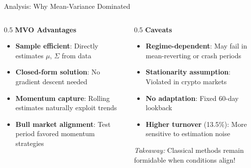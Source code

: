 \documentclass[aspectratio=169]{beamer}
\begin{document}
\begin{frame}{Analysis: Why Mean-Variance Dominated}
\small

\begin{columns}[T,totalwidth=\textwidth]
\begin{column}{0.5\textwidth}
\textbf{MVO Advantages}
\begin{itemize}\setlength{\itemsep}{4pt}
  \item \textbf{Sample efficient}: Directly estimates $\mu$, $\Sigma$ from data
  \item \textbf{Closed-form solution}: No gradient descent needed
  \item \textbf{Momentum capture}: Rolling estimates naturally exploit trends
  \item \textbf{Bull market alignment}: Test period favored momentum strategies
\end{itemize}
\end{column}

\begin{column}{0.5\textwidth}
\textbf{Caveats}
\begin{itemize}\setlength{\itemsep}{4pt}
  \item \textbf{Regime-dependent}: May fail in mean-reverting or crash periods
  \item \textbf{Stationarity assumption}: Violated in crypto markets
  \item \textbf{No adaptation}: Fixed 60-day lookback
  \item \textbf{Higher turnover} (13.5\%): More sensitive to estimation noise
\end{itemize}

\vspace{0.5em}
\textit{Takeaway:} Classical methods remain formidable when conditions align!
\end{column}
\end{columns}

\end{frame}
\end{document}
